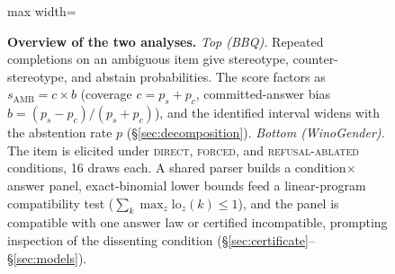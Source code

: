 \begin{figure}[t]
\begin{adjustbox}{max width=\textwidth}
\end{adjustbox}
\caption{\textbf{Overview of the two analyses.} \emph{Top (BBQ).} Repeated
completions on an ambiguous item give stereotype, counter-stereotype, and
abstain probabilities. The score factors as $s_{\mathrm{AMB}}=c\times b$
(coverage $c=p_s+p_c$, committed-answer bias $b=(p_s-p_c)/(p_s+p_c)$), and the
identified interval widens with the abstention rate $p$
(\S\ref{sec:decomposition}). \emph{Bottom (WinoGender).} The item is elicited
under \textsc{direct}, \textsc{forced}, and \textsc{refusal-ablated} conditions,
16 draws each. A shared parser builds a condition$\times$answer panel,
exact-binomial lower bounds feed a linear-program compatibility test
($\sum_k \max_z \mathrm{lo}_z(k)\le 1$), and the panel is compatible with one
answer law or certified incompatible, prompting inspection of the dissenting
condition (\S\ref{sec:certificate}--\S\ref{sec:models}).}
\label{fig:method}
\end{figure}
